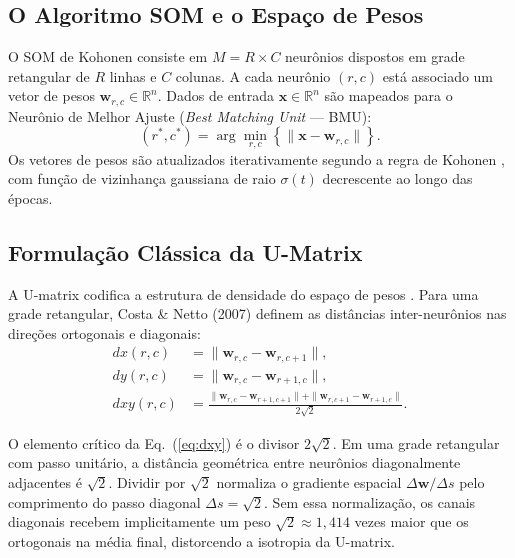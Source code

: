 \documentclass[10pt,journal,compsoc,twocolumn]{IEEEtran}
\begin{document}
\subsection{O Algoritmo SOM e o Espa\c{c}o de Pesos}
O SOM de Kohonen \cite{kohonen1982self} consiste em $M = R \times C$
neur\^onios dispostos em grade retangular de $R$ linhas e $C$ colunas.
A cada neur\^onio $(r,c)$ est\'a associado um vetor de pesos
$\mathbf{w}_{r,c} \in \mathbb{R}^n$. Dados de entrada
$\mathbf{x} \in \mathbb{R}^n$ s\~ao mapeados para o Neur\^onio de Melhor
Ajuste (\textit{Best Matching Unit} --- BMU):
\begin{equation}
    (r^*, c^*) = \arg\min_{r,c} \left\{ \|\mathbf{x} - \mathbf{w}_{r,c}\| \right\}.
\end{equation}
Os vetores de pesos s\~ao atualizados iterativamente segundo a regra de
Kohonen \cite{kohonen2013essentials}, com fun\c{c}\~ao de vizinhan\c{c}a
gaussiana de raio $\sigma(t)$ decrescente ao longo das \'epocas.

\subsection{Formula\c{c}\~ao Cl\'assica da U-Matrix}
\label{subsec:umatrix_classica}
A U-matrix codifica a estrutura de densidade do espa\c{c}o de pesos
\cite{ultsch1993self}. Para uma grade retangular, Costa \& Netto (2007)
\cite{costa2007segmentacao} definem as dist\^ancias inter-neur\^onios
nas dire\c{c}\~oes ortogonais e diagonais:
\begin{align}
    dx(r,c) &= \|\mathbf{w}_{r,c} - \mathbf{w}_{r,c+1}\|, \label{eq:dx}\\
    dy(r,c) &= \|\mathbf{w}_{r,c} - \mathbf{w}_{r+1,c}\|, \label{eq:dy}\\
    dxy(r,c) &= \frac{\|\mathbf{w}_{r,c} - \mathbf{w}_{r+1,c+1}\| +
              \|\mathbf{w}_{r,c+1} - \mathbf{w}_{r+1,c}\|}{2\sqrt{2}}. \label{eq:dxy}
\end{align}

O elemento cr\'itico da Eq.~(\ref{eq:dxy}) \'e o divisor $2\sqrt{2}$.
Em uma grade retangular com passo unit\'ario, a dist\^ancia geom\'etrica
entre neur\^onios diagonalmente adjacentes \'e $\sqrt{2}$. Dividir por
$\sqrt{2}$ normaliza o gradiente espacial $\Delta\mathbf{w}/\Delta s$ pelo
comprimento do passo diagonal $\Delta s = \sqrt{2}$. Sem essa
normaliza\c{c}\~ao, os canais diagonais recebem implicitamente um peso
$\sqrt{2} \approx 1{,}414$ vezes maior que os ortogonais na m\'edia final,
distorcendo a isotropia da U-matrix.
\end{document}
